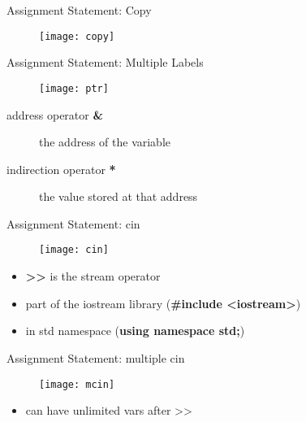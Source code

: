\documentclass[xcolor={dvipsnames}]{beamer}
\begin{document}
\begin{frame}{Assignment Statement: Copy}
\begin{figure}
	\texttt{[image: copy]}
\end{figure}
\end{frame}

\begin{frame}{Assignment Statement: Multiple Labels}
\begin{figure}
	\texttt{[image: ptr]}
\end{figure}

\begin{block}{}
	\begin{description}
		\item[address operator \textbf{\&}] the address of the variable
		\item[indirection operator \textbf{*}] the value stored at that address		
	\end{description}
\end{block}
\end{frame}

\begin{frame}{Assignment Statement: cin}
\begin{figure}
	\texttt{[image: cin]}
\end{figure}

\begin{block}{}
	\begin{itemize}
		\item \textbf{\textgreater\textgreater}  is the stream operator
		\item part of the iostream library (\textbf{\#include \textless iostream\textgreater})
		\item in std namespace (\textbf{using namespace std;})
	\end{itemize}
\end{block}
\end{frame}

\begin{frame}{Assignment Statement: multiple cin}
\begin{figure}
	\texttt{[image: mcin]}
\end{figure}

\begin{block}{}
	\begin{itemize}
		\item can have unlimited vars after \textgreater\textgreater
	\end{itemize}
\end{block}
\end{frame}
\end{document}
